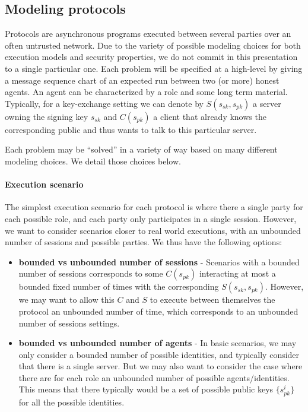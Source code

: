 \documentclass{article}
\newcommand{\sfsk}{\mathit{sk}}
\newcommand{\sfpk}{\mathit{pk}}
\begin{document}
\subsection{Modeling protocols}

Protocols are asynchronous programs executed between several parties over an often untrusted network. Due to the variety of possible modeling choices for both execution models and security properties, we do not commit in this presentation to a single particular one. Each problem will be specified at a high-level by giving a message sequence chart of an expected run between two (or more) honest agents. An agent can be characterized by a role and some long term material. Typically, for a key-exchange setting we can denote by $S(s_\sfsk,s_\sfpk)$ a server  owning the signing key $s_\sfsk$ and $C(s_\sfpk)$ a client that already knows the corresponding public and thus wants to talk to this particular server.


Each problem may be ``solved'' in a variety of way based on many different modeling choices. We detail those choices below.

\paragraph{Execution scenario} The simplest execution scenario for each protocol is where there a single party for each possible role, and each party only participates in a single session. However, we want to consider scenarios closer to real world executions, with an unbounded number of sessions and possible parties.
We thus have the following options:
\begin{itemize}
\item \textbf{bounded vs unbounded number of sessions} - Scenarios with a bounded number of sessions corresponds to some $C(s_\sfpk)$ interacting at most a bounded fixed number of times with the corresponding $S(s_\sfsk,s_\sfpk)$. However, we may want to allow this $C$ and $S$ to execute between themselves the protocol an unbounded number of time, which corresponds to an unbounded number of sessions settings.
\item \textbf{bounded vs unbounded number of agents} - In basic scenarios, we may only consider a bounded number of possible identities, and typically consider that there is a single server. But we may also want to consider the case where there are for each role an unbounded number of possible agents/identities. This means that there typically would be a set of possible public keys $\{s_\sfpk^i\}$ for all the possible identities.
\end{itemize}
\end{document}
